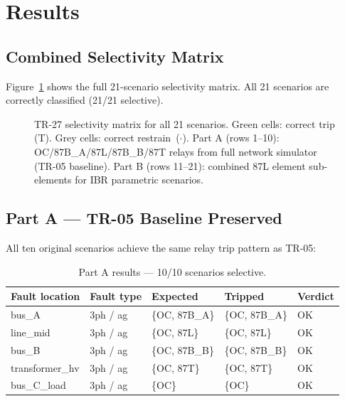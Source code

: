 \documentclass[11pt,a4paper]{article}
\begin{document}
\section{Results}

\subsection{Combined Selectivity Matrix}

Figure~\ref{fig:matrix} shows the full 21-scenario selectivity matrix.
All 21 scenarios are correctly classified (21/21 selective).

\begin{figure}[h!]
  \centering
  
  \caption{TR-27 selectivity matrix for all 21 scenarios.
           Green cells: correct trip (T).
           Grey cells: correct restrain~($\cdot$).
           Part A (rows 1--10): OC/87B\_A/87L/87B\_B/87T relays from full
           network simulator (TR-05 baseline).
           Part B (rows 11--21): combined 87L element sub-elements for
           IBR parametric scenarios.}
  \label{fig:matrix}
\end{figure}

\subsection{Part A — TR-05 Baseline Preserved}

All ten original scenarios achieve the same relay trip pattern as TR-05:

\begin{table}[h!]
\centering
\caption{Part A results — 10/10 scenarios selective.}
\label{tab:parta}
\begin{tabular}{lllll}
\toprule
Fault location & Fault type & Expected & Tripped & Verdict \\
\midrule
bus\_A         & 3ph / ag   & \{OC, 87B\_A\}    & \{OC, 87B\_A\}    & OK \\
line\_mid      & 3ph / ag   & \{OC, 87L\}       & \{OC, 87L\}       & OK \\
bus\_B         & 3ph / ag   & \{OC, 87B\_B\}    & \{OC, 87B\_B\}    & OK \\
transformer\_hv & 3ph / ag  & \{OC, 87T\}       & \{OC, 87T\}       & OK \\
bus\_C\_load   & 3ph / ag   & \{OC\}            & \{OC\}            & OK \\
\bottomrule
\end{tabular}
\end{table}
\end{document}
